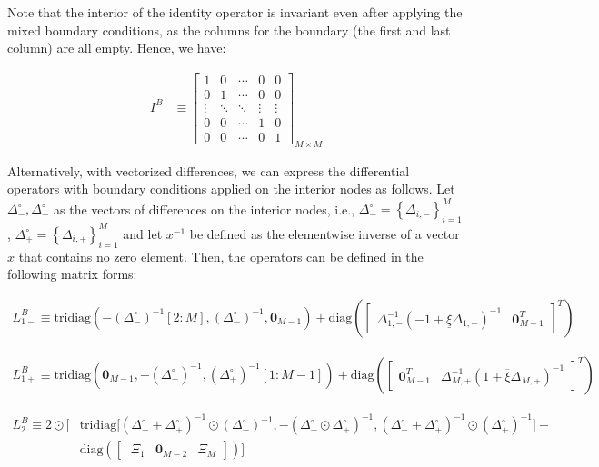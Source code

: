 \documentclass[11pt]{article}
\newcommand{\set}[1]{\ensuremath{\left\{{#1}\right\}}}
\newcommand{\tridiag}{\ensuremath{\mathrm{tridiag}}}
\newcommand{\diag}{\ensuremath{\mathrm{diag}}}
\theoremstyle{definition}
\begin{document}
Note that the interior of the identity operator is invariant even after applying the mixed boundary conditions, as the columns for the boundary (the first and last column) are all empty. Hence, we have:

\begin{align}
I^B &\equiv \begin{bmatrix}
1 & 0 & \cdots & 0 & 0 \\
0 & 1 & \cdots & 0 & 0 \\
\vdots  & \ddots & \ddots &  \vdots  & \vdots   \\
0 & 0 & \cdots & 1 & 0 \\
0 & 0 & \cdots & 0 & 1
\end{bmatrix}_{M\times M}
\end{align}



Alternatively, with vectorized differences, we can express the differential operators with boundary conditions applied on the interior nodes as follows. Let $\Delta_-^\circ, \Delta_+^\circ$ as the vectors of differences on the interior nodes, i.e., $\Delta_{-}^\circ = \set{\Delta_{i,-}}_{i=1}^M$, $\Delta_{+}^\circ = \set{\Delta_{i,+}}_{i=1}^M$ and let $x^{-1}$ be defined as the elementwise inverse of a vector $x$ that contains no zero element. Then, the operators can be defined in the following matrix forms:


\begin{align}
{L}_{1-}^B \equiv
\tridiag \left(-(\Delta_-^\circ)^{-1}[2:M], (\Delta_-^\circ )^{-1}, \mathbf{0}_{M-1}  \right) +
\diag\left( 
\begin{bmatrix}
\Delta^{-1}_{1,-} (-1 + \underline{\xi} \Delta_{1,-})^{-1} &
\mathbf{0}_{M-1}^T
\end{bmatrix}^T
 \right)
\end{align}

\begin{align}
{L}_{1+}^B \equiv
\tridiag \left(\mathbf{0}_{M-1}, -(\Delta_+^\circ )^{-1}, (\Delta_+^\circ)^{-1}[1:M-1]  \right) +
\diag\left( 
\begin{bmatrix}
\mathbf{0}_{M-1}^T &
\Delta^{-1}_{M,+} (1 + \overline{\xi} \Delta_{M,+})^{-1}
\end{bmatrix}^T
\right)
\end{align}

\begin{align}
{L}_{2}^B \equiv
2 \odot \Big[ & \text{tridiag} \Big[(\Delta_-^\circ + \Delta_+^\circ)^{-1} \odot (\Delta_{-}^\circ)^{-1}, 
-(\Delta_-^\circ \odot \Delta_+^\circ)^{-1},
(\Delta_-^\circ + \Delta_+^\circ)^{-1} \odot (\Delta_{+}^\circ)^{-1} \Big] + \\ & \diag\left(  
\begin{bmatrix} \
\Xi_1 & \mathbf{0}_{M-2} & \Xi_M
\end{bmatrix}
  \right) \Big]
\end{align}
\end{document}
